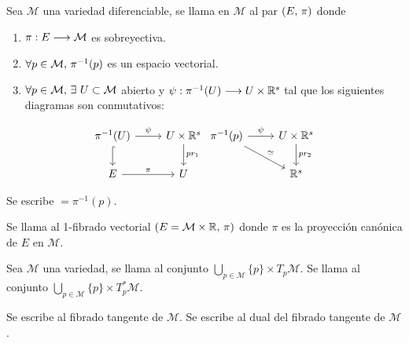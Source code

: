 \begin{definition}
  Sea $\mathcal{M}$ una variedad diferenciable, se llama  en $\mathcal{M}$ al
  par $(E,\thinspace \pi)$ donde
  \begin{enumerate}
    \item $\pi:E\longrightarrow \mathcal{M}$ es sobreyectiva.
    \item $\forall p\in \mathcal{M},\thinspace\pi^{-1}(p)$ es un espacio vectorial.
    \item $\forall p\in \mathcal{M}\coma\exists\ U\subset \mathcal{M}$ abierto y $\psi:\pi^{-1}(U)\longrightarrow U\times\mathbb{R}^s$
    tal que los siguientes diagramas son conmutativos:
  \end{enumerate}
  \[
    \begin{tikzcd}
      \pi^{-1}(U)\arrow{r}{\psi}\arrow[hook]{d} & U\times\R^s\arrow{d}{pr_1}\\
      E\arrow{r}{\pi} & U
    \end{tikzcd}
    \begin{tikzcd}
      \pi^{-1}(p)\arrow{r}{\psi}\arrow{dr}{\simeq} & U\times\R^s\arrow{d}{pr_2}\\
       & \R^s
    \end{tikzcd}
  \]
\end{definition}
\begin{notation}
  Se escribe $=\pi^{-1}(p)$.
\end{notation}

\begin{definition}
Se llama  al 1-fibrado vectorial $
(E=\mathcal{M}\times\mathbb{R},\thinspace\pi)$ donde
$\pi$
es la proyección canónica de $E$ en $\mathcal{M}$.
\end{definition}

\begin{definition}
  Sea $\mathcal{M}$ una variedad, se llama  al conjunto $\bigcup_{p\in \mathcal{M}}\{p\}\times T_p\mathcal{M}$.
  Se llama  al conjunto $\bigcup_{p\in \mathcal{M}}\{p\}\times T^*_p\mathcal{M}$.
\end{definition}
\begin{notation}
  Se escribe  al fibrado tangente de $\mathcal{M}$.
  Se escribe  al dual del fibrado
  tangente de $\mathcal{M}$.
\end{notation}


